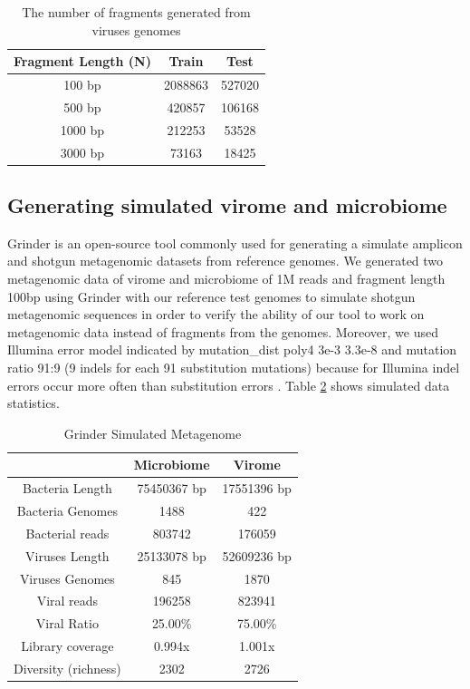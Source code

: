 \documentclass[conference]{IEEEtran}
\begin{document}
\begin{table}[h!]
	\centering
	\begin{tabular}{||c c c||} 
		Fragment Length (N) & Train & Test \\ [0.5ex] 
		\hline\hline
		100 bp & 2088863  & 527020  \\ 
		500 bp & 420857  & 106168  \\
		1000 bp & 212253  & 53528  \\
		3000 bp & 73163  & 18425  \\ [1ex] 
	\end{tabular}
	\caption{The number of fragments generated from viruses genomes}
	\label{table:fragments_stats}
\end{table}

\subsection{Generating simulated virome and microbiome}
Grinder \cite{angly2012grinder} is an open-source tool commonly used for generating a simulate amplicon and shotgun metagenomic datasets from reference genomes. 
We generated two metagenomic data of virome and microbiome of 1M reads and fragment length 100bp using Grinder with our reference test genomes to simulate shotgun metagenomic sequences in order to verify the ability of our tool to work on metagenomic data instead of fragments from the genomes. Moreover, we used Illumina error model indicated by mutation\_dist poly4 3e-3 3.3e-8 and mutation ratio 91:9 (9 indels for each 91 substitution mutations) because for Illumina indel errors occur more often than substitution errors \cite{laehnemann2015denoising}. Table \ref{table:simulate_stats} shows simulated data statistics.  \\

\begin{table}[h!]
	\centering
	\begin{tabular}{||c c c||} 
		& Microbiome & Virome \\ [0.5ex] 
		\hline\hline
		Bacteria Length & 75450367  bp  & 17551396 bp  \\
		Bacteria Genomes & 1488 & 422\\
		Bacterial reads & 803742 & 176059\\
		Viruses Length & 25133078 bp  & 52609236 bp  \\ 
		Viruses Genomes & 845 & 1870\\
		Viral reads & 196258 & 823941 \\  
		Viral Ratio & 25.00\% & 75.00\% \\ 
		Library coverage &  0.994x &  1.001x  \\
		Diversity (richness) & 2302 & 2726 \\ [1ex]
	\end{tabular}
	\caption{Grinder Simulated Metagenome}
	\label{table:simulate_stats}
\end{table}
\end{document}
